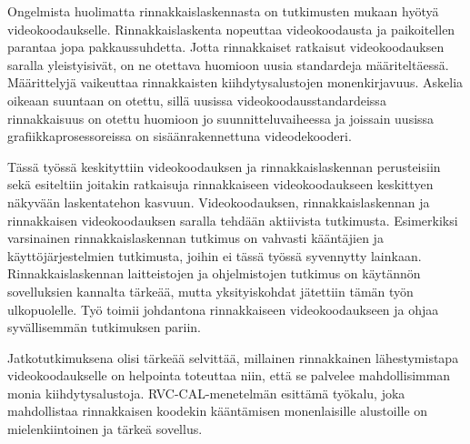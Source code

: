 Ongelmista huolimatta rinnakkaislaskennasta on tutkimusten mukaan hyötyä
videokoodaukselle. Rinnakkaislaskenta nopeuttaa videokoodausta ja paikoitellen
parantaa jopa pakkaussuhdetta. Jotta rinnakkaiset ratkaisut videokoodauksen
saralla yleistyisivät, on ne otettava huomioon uusia standardeja
määriteltäessä. Määrittelyjä vaikeuttaa rinnakkaisten kiihdytysalustojen
monenkirjavuus. Askelia oikeaan suuntaan on otettu, sillä uusissa
videokoodausstandardeissa rinnakkaisuus on otettu huomioon jo
suunnitteluvaiheessa ja joissain uusissa grafiikkaprosessoreissa on
sisäänrakennettuna videodekooderi.

Tässä työssä keskityttiin videokoodauksen ja rinnakkaislaskennan perusteisiin
sekä esiteltiin joitakin ratkaisuja rinnakkaiseen videokoodaukseen keskittyen
näkyvään laskentatehon kasvuun. Videokoodauksen, rinnakkaislaskennan ja
rinnakkaisen videokoodauksen saralla tehdään aktiivista tutkimusta. Esimerkiksi
varsinainen rinnakkaislaskennan tutkimus on vahvasti kääntäjien ja
käyttöjärjestelmien tutkimusta, joihin ei tässä työssä syvennytty lainkaan.
Rinnakkaislaskennan laitteistojen ja ohjelmistojen tutkimus on käytännön
sovelluksien kannalta tärkeää, mutta yksityiskohdat jätettiin tämän työn ulkopuolelle.
Työ toimii johdantona rinnakkaiseen videokoodaukseen ja ohjaa syvällisemmän
tutkimuksen pariin.

Jatkotutkimuksena olisi tärkeää selvittää, millainen rinnakkainen
lähestymistapa videokoodaukselle on helpointa toteuttaa niin, että se
palvelee mahdollisimman monia kiihdytysalustoja. RVC-CAL-menetelmän esittämä
työkalu, joka mahdollistaa rinnakkaisen koodekin kääntämisen monenlaisille
alustoille on mielenkiintoinen ja tärkeä sovellus. 


